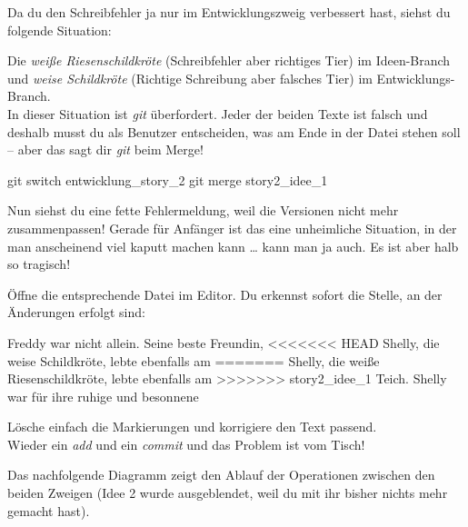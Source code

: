 \documentclass[
  letterpaper,
  DIV=11]{scrreprt}
\newenvironment{Shaded}{\begin{snugshade}}{\end{snugshade}}
\newcommand{\ExtensionTok}[1]{\textcolor[rgb]{0.00,0.23,0.31}{#1}}
\newcommand{\FunctionTok}[1]{\textcolor[rgb]{0.28,0.35,0.67}{#1}}
\newcommand{\NormalTok}[1]{\textcolor[rgb]{0.00,0.23,0.31}{#1}}
\newcommand{\OperatorTok}[1]{\textcolor[rgb]{0.37,0.37,0.37}{#1}}
\newcommand{\git}{\textit{git}\xspace}
\begin{document}
Da du den Schreibfehler ja nur im Entwicklungszweig verbessert hast,
siehst du folgende Situation:

Die \emph{weiße Riesenschildkröte} (Schreibfehler aber richtiges Tier)
im Ideen-Branch und \emph{weise Schildkröte} (Richtige Schreibung aber
falsches Tier) im Entwicklungs-Branch.\\
In dieser Situation ist \git überfordert. Jeder der beiden Texte ist
falsch und deshalb musst du als Benutzer entscheiden, was am Ende in der
Datei stehen soll -- aber das sagt dir \git  beim Merge!

\begin{Shaded}
\begin{Highlighting}[]
\FunctionTok{git}\NormalTok{ switch entwicklung\_story\_2}
\FunctionTok{git}\NormalTok{ merge story2\_idee\_1}
\end{Highlighting}
\end{Shaded}

Nun siehst du eine fette Fehlermeldung, weil die Versionen nicht mehr
zusammenpassen! Gerade für Anfänger ist das eine unheimliche Situation,
in der man anscheinend viel kaputt machen kann \ldots{} kann man ja
auch. Es ist aber halb so tragisch!

Öffne die entsprechende Datei im Editor. Du erkennst sofort die Stelle,
an der Änderungen erfolgt sind:

\begin{Shaded}
\begin{Highlighting}[]
\ExtensionTok{Freddy}\NormalTok{ war nicht allein. Seine beste Freundin,}
\OperatorTok{\textless{}\textless{}\textless{}\textless{}\textless{}\textless{}\textless{}}\NormalTok{ HEAD}
\ExtensionTok{Shelly,}\NormalTok{ die weise Schildkröte, lebte ebenfalls am}
\ExtensionTok{=======}
\ExtensionTok{Shelly,}\NormalTok{ die weiße Riesenschildkröte, lebte ebenfalls am}
\OperatorTok{\textgreater{}\textgreater{}\textgreater{}\textgreater{}\textgreater{}\textgreater{}\textgreater{}}\NormalTok{ story2\_idee\_1}
\ExtensionTok{Teich.}\NormalTok{ Shelly war für ihre ruhige und besonnene}
\end{Highlighting}
\end{Shaded}

Lösche einfach die Markierungen und korrigiere den Text passend.\\
Wieder ein \emph{add} und ein \emph{commit} und das Problem ist vom
Tisch!

Das nachfolgende Diagramm zeigt den Ablauf der Operationen zwischen den
beiden Zweigen (Idee 2 wurde ausgeblendet, weil du mit ihr bisher nichts
mehr gemacht hast).
\end{document}
